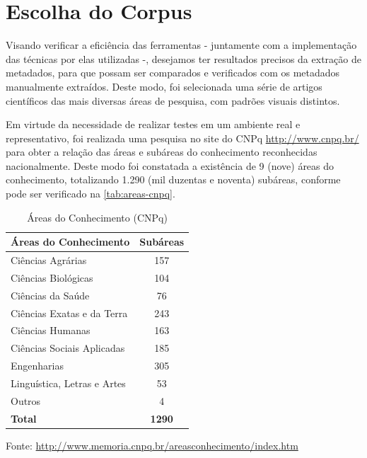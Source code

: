\section{Escolha do Corpus}
\label{sec:corpus}


Visando verificar a eficiência das ferramentas - juntamente com a implementação das técnicas por elas utilizadas -, desejamos ter resultados precisos da extração de metadados, para que possam ser comparados e verificados com os metadados manualmente extraídos. Deste modo, foi selecionada uma série de artigos científicos das mais diversas áreas de pesquisa, com padrões visuais distintos.


Em virtude da necessidade de realizar testes em um ambiente real e representativo, foi realizada uma pesquisa no site do CNPq \url{http://www.cnpq.br/} para obter a relação das áreas e subáreas do conhecimento reconhecidas nacionalmente. Deste modo foi constatada a existência de 9 (nove) áreas do conhecimento, totalizando 1.290 (mil duzentas e noventa) subáreas, conforme pode ser verificado na \autoref{tab:areas-cnpq}.

\begin{table}[h!]
    \caption{Áreas do Conhecimento (CNPq)}
    \begin{center}
        \begin{tabular}{|l|c|}
            \hline 
            \textbf{Áreas do Conhecimento} & \textbf{Subáreas} \\ 
            \hline 
            Ciências Agrárias & 157 \\
            Ciências Biológicas & 104 \\
            Ciências da Saúde & 76 \\
            Ciências Exatas e da Terra & 243 \\
            Ciências Humanas & 163 \\
            Ciências Sociais Aplicadas & 185 \\
            Engenharias & 305 \\
            Linguística, Letras e Artes & 53 \\
            Outros & 4 \\
            \hline
            \textbf{Total} & \textbf{1290} \\
            \hline
        \end{tabular}
    \end{center}
    \center\footnotesize{Fonte: \url{http://www.memoria.cnpq.br/areasconhecimento/index.htm}}
    \label{tab:areas-cnpq}
\end{table}

